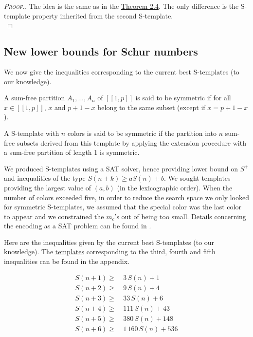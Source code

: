 \begin{proof}[\textsc{Proof.}]
The idea is the same as in the \hyperref[Theorem2.4]{Theorem 2.4}. The only difference is the S-template property inherited 
from the second S-template. \\
\end{proof}


\subsection{New lower bounds for Schur numbers}
\label{Subsection2.3}
We now give the inequalities corresponding to the current  best S-templates (to our knowledge).

\begin{definition}
A sum-free partition \(A_1, ..., A_n\) of \([\![1, p]\!]\) is said to be symmetric if for all \( x \in [\![1, p]\!]\), 
\(x\) and \(p + 1 - x\) belong to the same subset (except if \(x = p + 1 - x\)).

A S-template with \(n\) colors is said to be symmetric if the partition into \(n\) sum-free subsets derived 
from this template by applying the extension procedure with a sum-free partition of length 1 is symmetric. 
\end{definition}

We produced S-templates using a SAT solver, hence providing lower bound on \(S^+\) and inequalities 
of the type \(S(n+k) \geqslant a S(n) + b\). We sought templates providing the largest value of 
\((a, b)\) (in the lexicographic order). When the number of colors exceeded five, in order to reduce the search space we 
only looked for symmetric S-templates, we assumed that the special color was the last color to appear and we constrained 
the \(m_c\)'s out of being too small. Details concerning the encoding as a SAT problem can be found in \cite{Heule2017}.

\par
Here are the inequalities given by the current best S-templates (to our knowledge). The \hyperref[S-templates]{templates} 
corresponding to the third, fourth and fifth inequalities can be found in the appendix.

\begin{align}
	S(n + 1) \geqslant &~3\,S(n)  + 1 \label{S(n+1)}\\
	S(n + 2) \geqslant &~9\,S(n)  + 4 \label{S(n+2)}\\
	S(n + 3) \geqslant &~33\,S(n) + 6 \label{S(n+3)}\\
	S(n + 4) \geqslant &~111\,S(n) + 43 \label{S(n+4)}\\
	S(n + 5) \geqslant &~380\,S(n) + 148 \label{S(n+5)}\\
	S(n + 6) \geqslant &~1\,160\,S(n) + 536 \label{S(n+6)}
\end{align}


